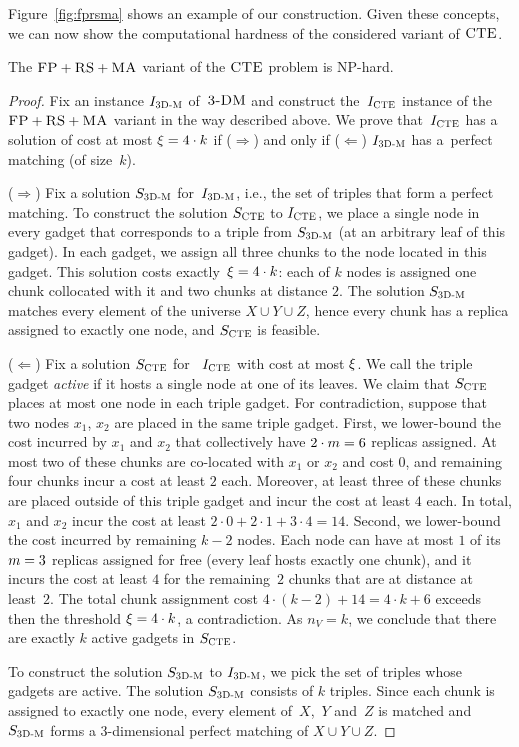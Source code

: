 Figure~\ref{fig:fprsma} shows an example of our construction.
Given these concepts, we can now show the computational hardness of the considered variant of $\textsc{CTE}$.
\begin{theorem}
  The $\textsc{FP}+\textsc{RS}+\textsc{MA}$ variant of the $\textsc{CTE}$ problem is NP-hard.
  \label{th:ma-unlimited}
\end{theorem}
\begin{proof}
Fix an instance $I_{\mathrm{\textsc{3D-M}}}$ of~$\textsc{3-DM}$ and construct the~$I_{\mathrm{\textsc{CTE}}}$ instance of
the~$\textsc{FP}+\textsc{RS}+\textsc{MA}$ variant in the way described above. We prove that~$I_{\mathrm{\textsc{CTE}}}$ has a solution of cost at most $\xi = 4 \cdot k$ if ($\Rightarrow$) and only if
($\Leftarrow$)
$I_{\mathrm{\textsc{3D-M}}}$ has a~perfect matching (of size~$k$).

\medskip

($\Rightarrow$) Fix a solution $S_{\mathrm{\textsc{3D-M}}}$ for~$I_{\mathrm{\textsc{3D-M}}}$, i.e., the set of triples that form a perfect matching. To construct the solution $S_{\mathrm{\textsc{CTE}}}$ to $I_{\mathrm{\textsc{CTE}}}$, we place a single node in every
gadget that corresponds to a triple from $S_{\mathrm{\textsc{3D-M}}}$ (at an arbitrary leaf of this gadget). In each gadget, we assign all three chunks to the node located in this gadget. This
solution costs exactly~$\xi = 4\cdot k$: each of $k$ nodes is assigned one chunk collocated with it and two chunks at distance $2$.
The solution $S_{\mathrm{\textsc{3D-M}}}$ matches every element of the universe $X \cup Y \cup Z$, hence every chunk has a replica assigned to exactly one node, and $S_{\mathrm{\textsc{CTE}}}$ is feasible.

\medskip

($\Leftarrow$) Fix a solution $S_{\mathrm{\textsc{CTE}}}$ for ~$I_{\mathrm{\textsc{CTE}}}$ with cost at most $\xi$.
We call the triple gadget \emph{active} if it hosts a single node at one of its leaves.
We claim that $S_{\mathrm{\textsc{CTE}}}$ places at most one node in each triple gadget.
For contradiction, suppose that two nodes $x_1$, $x_2$ are placed in the same triple gadget.
First, we lower-bound the cost incurred by $x_1$ and $x_2$ that collectively have $2\cdot m = 6$ replicas assigned.
At most two of these chunks are co-located with $x_1$ or $x_2$ and cost $0$, and remaining four chunks incur a cost at least $2$ each.
Moreover, at least three of these chunks are placed outside of this triple gadget and incur the cost at least $4$ each.
In total, $x_1$ and $x_2$ incur the cost at least $2\cdot 0+2\cdot 1+3\cdot 4=14$.
Second, we lower-bound the cost incurred by remaining $k-2$ nodes.
Each node can have at most $1$ of its $m=3$ replicas assigned for free (every leaf hosts exactly one chunk),
and it incurs the cost at least $4$ for the remaining~$2$ chunks that are at distance at least~$2$.
The total chunk assignment cost $4\cdot (k-2)+14 = 4\cdot k + 6$ exceeds then the threshold $\xi = 4\cdot k$, a contradiction.
As $n_V = k$, we conclude that there are exactly $k$ active gadgets in $S_{\mathrm{\textsc{CTE}}}$.

To construct the solution $S_{\mathrm{\textsc{3D-M}}}$ to $I_{\mathrm{\textsc{3D-M}}}$, we pick the set of triples whose gadgets are active.
The solution $S_{\mathrm{\textsc{3D-M}}}$ consists of $k$ triples.
Since each chunk is assigned to exactly one node, every element of~$X$,~$Y$ and~$Z$ is matched and $S_{\mathrm{\textsc{3D-M}}}$ forms a 3-dimensional perfect matching of $X \cup Y\cup Z$.
\end{proof}

